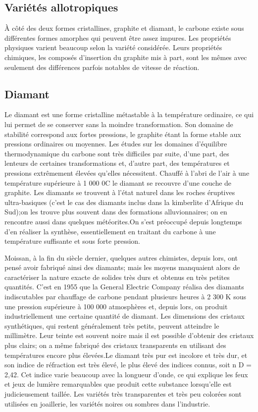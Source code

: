 \documentclass[a4 paper, 10 pt]{article}
\begin{document}
\subsection{Variétés allotropiques}

\label{Compins}À côté des deux formes cristallines, graphite et diamant, le
carbone existe sous différentes formes amorphes qui peuvent être
assez impures. Les propriétés physiques varient beaucoup selon
la variété considérée. Leurs propriétés chimiques,
les composés d'insertion du graphite mis à part, sont les
mêmes avec seulement des différences parfois notables de vitesse
de réaction.  

\subsection{Diamant} 


Le diamant est une forme cristalline
métastable à la température ordinaire, ce qui lui permet de
se conserver sans la moindre transformation. Son domaine de
stabilité correspond aux fortes pressions, le graphite étant la
forme stable aux pressions ordinaires ou moyennes. Les études sur
les domaines d'équilibre thermodynamique du carbone sont très
difficiles par suite, d'une part, des lenteurs de certaines
transformations et, d'autre part, des températures et pressions
extrêmement élevées qu'elles nécessitent. Chauffé à
l'abri de l'air à une température supérieure à
1 000 0C le diamant se recouvre d'une couche de graphite.  Les
diamants se trouvent à l'état naturel dans les roches
éruptives ultra-basiques (c'est le cas des diamants inclus dans la kimberlite d'Afrique du Sud);on les trouve plus souvent dans des
formations alluvionnaires; on en rencontre aussi dans quelques
météorites.On s'est préoccupé depuis longtemps d'en
réaliser la synthèse, essentiellement en traitant du carbone
à une température suffisante et sous forte pression.\newline 



Moissan, à la fin du siècle dernier, quelques autres chimistes, depuis
lors, ont pensé avoir fabriqué ainsi des diamants; mais les
moyens manquaient alors de caractériser la nature exacte de solides
très durs et obtenus en très petites quantités. C'est en 1955
que la General Electric Company réalisa des diamants indiscutables
par chauffage de carbone pendant plusieurs heures à 2 300 K
sous une pression supérieure à 100 000 atmosphères et,
depuis lors, on produit industriellement une certaine quantité de
diamant. Les dimensions des cristaux synthétiques, qui restent
généralement très petits, peuvent atteindre le
millimètre. Leur teinte est souvent noire mais il est possible
d'obtenir des cristaux plus clairs; on a même fabriqué des
cristaux transparents en utilisant des températures encore plus
élevées.Le diamant très pur est incolore et très dur, et
son indice de réfraction est très élevé, le plus
élevé des indices connus, soit n D = 2,42. Cet indice
varie beaucoup avec la longueur d'onde, ce qui explique les feux et
jeux de lumière remarquables que produit cette substance
lorsqu'elle est judicieusement taillée. Les variétés très
transparentes et très peu colorées sont utilisées en
joaillerie, les variétés noires ou sombres dans l'industrie.
\end{document}
